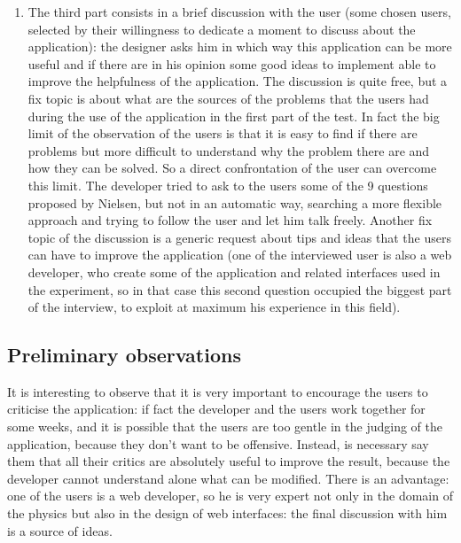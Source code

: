 \begin{enumerate}
\item 
The third part consists in a brief discussion with the user (some chosen users, selected by their willingness to dedicate a moment to discuss about the application): the designer asks him in which way this application can be more useful and if there are in his opinion some good ideas to implement able to improve the helpfulness of the application. The discussion is quite free, but a fix topic is about what are the sources of the problems that the users had during the use of the application in the first part of the test. In fact the big limit of the observation of the users is that it is easy to find if there are problems but more difficult to understand why the problem there are and how they can be solved. So a direct confrontation of the user can overcome this limit. 
The developer tried to ask to the users some of the 9 questions proposed by Nielsen, but not in an automatic way, searching a more flexible approach and trying to follow the user and let him talk freely.
Another fix topic of the discussion is a generic request about tips and ideas that the users can have to improve the application (one of the interviewed user is also a web developer, who create some of the application and related interfaces used in the experiment, so in that case this second question occupied the biggest part of the interview, to exploit at maximum his experience in this field). 

\end{enumerate} 

\subsection{Preliminary observations}
It is interesting to observe that it is very important to encourage the users to criticise the application: if fact the developer and the users work together for some weeks, and it is possible that the users are too gentle in the judging of the application, because they don't want to be offensive. Instead, is necessary say them that all their critics are absolutely useful to improve the result, because the developer cannot understand alone what can be modified. 
There is an advantage: one of the users is a web developer, so he is very expert not only in the domain of the physics but also in the design of web interfaces: the final discussion with him is a source of ideas.  

